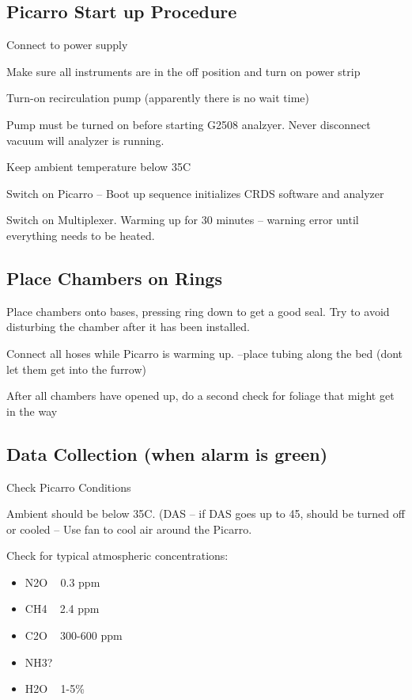 \documentclass[12pt]{../SOP3}\usepackage[]{graphicx}\usepackage[]{color}
\begin{document}
\subsection*{Picarro Start up Procedure}

\NP Connect to power supply

\NP Make sure all instruments are in the off position and turn on power strip

\NP Turn-on recirculation pump (apparently there is no wait time)

\NP Pump must be turned on before starting G2508 analzyer. Never disconnect vacuum will analyzer is running.

\NP Keep ambient temperature below 35\degree C

\NP Switch on Picarro  -- Boot up sequence initializes CRDS software and analyzer

\NP Switch on Multiplexer. Warming up for 30 minutes -- warning error until everything needs to be heated.

\subsection*{Place Chambers on Rings}

\NP Place chambers onto bases, pressing ring down to get a good seal. Try to avoid disturbing the chamber after it has been installed. 

\NP Connect all hoses while Picarro is warming up. --place tubing along the bed (dont let them get into the furrow)

\NP After all chambers have opened up, do a second check for foliage that might get in the way

\subsection*{Data Collection (when alarm is green)}

\NP Check Picarro Conditions

\NP Ambient should be below 35\degree C. (DAS -- if DAS goes up to 45\degree, should be turned off or cooled -- Use fan to cool air around the Picarro.
                               
\NP Check for typical atmospheric concentrations:
                                 
\begin{itemize}
\item N2O ~ 0.3 ppm
\item CH4 ~ 2.4 ppm
\item C2O ~ 300-600 ppm
\item NH3?
\item H2O ~ 1-5\%
\end{itemize}
                               
\end{document}
